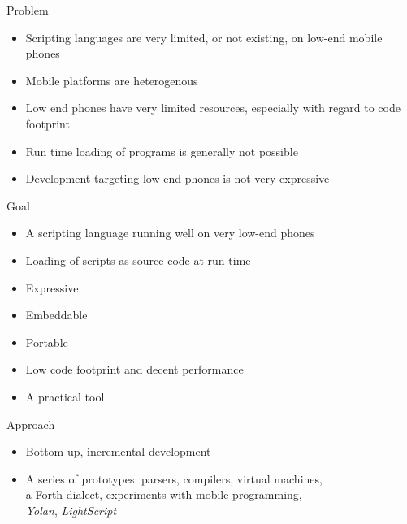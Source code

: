 \documentclass[a4paper,landscape]{slides}
\begin{document}
\begin{slide}
	{\large 
            Problem
	\\ \mbox{}}
	\begin{itemize} \setlength{\itemsep}{10mm}
            \item Scripting languages are very limited, or not existing, on low-end mobile phones
	\end{itemize}
	\begin{itemize} \setlength{\itemsep}{3mm}
            \item Mobile platforms are heterogenous
            \item Low end phones have very limited resources, especially with regard to code footprint
            \item Run time loading of programs is generally not possible
            \item Development targeting low-end phones is not very expressive
	\end{itemize}
\end{slide}

\begin{slide}
	{\large 
            Goal
	\\ \mbox{}}
	\begin{itemize} \setlength{\itemsep}{2mm}
            \item A scripting language running well on very low-end phones
            \item Loading of scripts as source code at run time
            \item Expressive
            \item Embeddable
            \item Portable
            \item Low code footprint and decent performance
            \item A practical tool
	\end{itemize}
\end{slide}
\begin{slide}
	{\large 
            Approach
	\\ \mbox{}}
	\begin{itemize} \setlength{\itemsep}{5mm}
            \item Bottom up, incremental development
            \item A series of prototypes: parsers, compilers, virtual machines, \\ a Forth dialect, experiments with mobile programming, \\ \emph{Yolan}, \emph{LightScript}
	\end{itemize}
\end{slide}
\end{document}
